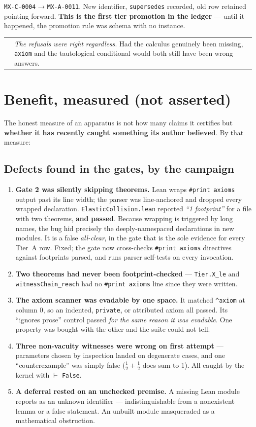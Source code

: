 \documentclass[11pt,a4paper]{article}
\makeatletter
\newcommand{\caveat}[1]{%
  \par\vspace{0.6em}\noindent
  \begin{tabular}{@{}p{0.4em}@{\hspace{0.8em}}p{\dimexpr\linewidth-2.2em\relax}@{}}
  \textcolor{rulegray}{\rule{2pt}{\baselineskip}} & \small #1
  \end{tabular}\par\vspace{0.6em}}
\makeatother
\begin{document}
\texttt{MX-C-0004} → \texttt{MX-A-0011}. New identifier, \texttt{supersedes} recorded, old row
retained pointing forward. \textbf{This is the first tier promotion in the ledger} — until it
happened, the promotion rule was schema with no instance.

\caveat{\emph{The refusals were right regardless.} Had the calculus genuinely been missing,
\texttt{axiom} and the tautological conditional would both still have been wrong answers.}

\section{Benefit, measured (not asserted)}

The honest measure of an apparatus is not how many claims it certifies but \textbf{whether it has
recently caught something its author believed}. By that measure:

\subsection{Defects found in the gates, by the campaign}

\begin{enumerate}
\item \textbf{Gate 2 was silently skipping theorems.} Lean wraps \texttt{\#print axioms} output
past its line width; the parser was line-anchored and dropped every wrapped declaration.
\texttt{ElasticCollision.lean} reported \emph{``1 footprint''} for a file with two theorems,
\textbf{and passed}. Because wrapping is triggered by long names, the bug hid precisely the
deeply-namespaced declarations in new modules. It is a false \emph{all-clear}, in the gate that
is the sole evidence for every Tier~A row. Fixed; the gate now cross-checks
\texttt{\#print axioms} directives against footprints parsed, and runs parser self-tests on every
invocation.

\item \textbf{Two theorems had never been footprint-checked} — \texttt{Tier.X_le} and
\texttt{witnessChain_reach} had no \texttt{\#print axioms} line since they were written.

\item \textbf{The axiom scanner was evadable by one space.} It matched \texttt{\^{}axiom} at
column 0, so an indented, \texttt{private}, or attributed axiom all passed. Its ``ignores prose''
control passed \emph{for the same reason it was evadable}. One property was bought with the other
and the suite could not tell.

\item \textbf{Three non-vacuity witnesses were wrong on first attempt} — parameters chosen by
inspection landed on degenerate cases, and one ``counterexample'' was simply false ($\tfrac12 +
\tfrac12$ does sum to 1). All caught by the kernel with $\vdash$ \texttt{False}.

\item \textbf{A deferral rested on an unchecked premise.} A missing Lean module reports as an
unknown identifier — indistinguishable from a nonexistent lemma or a false statement. An unbuilt
module masqueraded as a mathematical obstruction.
\end{enumerate}
\end{document}
